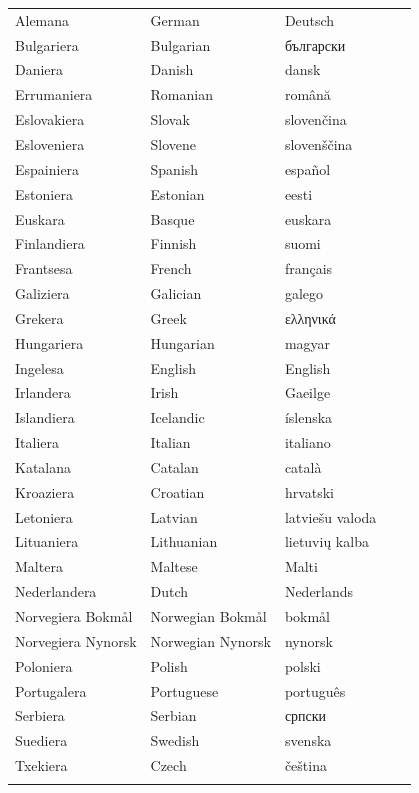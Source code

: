 \vspace*{-5mm}
\centering
  \setlength{\tabcolsep}{2em}
  \begin{tabularx}{\textwidth}{lllll} \toprule\addlinespace
  Alemana & German & Deutsch\\
  Bulgariera & Bulgarian & български \\
  Daniera & Danish & dansk\\
  Errumaniera & Romanian & română\\  
  Eslovakiera & Slovak & slovenčina\\
  Esloveniera & Slovene & slovenščina\\
  Espainiera & Spanish & español\\
  Estoniera & Estonian & eesti\\
  Euskara & Basque & euskara\\
  Finlandiera & Finnish & suomi\\
  Frantsesa & French & français\\
  Galiziera & Galician & galego\\
  Grekera & Greek & ελληνικά\\
  Hungariera & Hungarian & magyar\\ 
  Ingelesa & English & English\\
  Irlandera & Irish & Gaeilge\\
  Islandiera & Icelandic & íslenska\\
  Italiera & Italian & italiano\\
  Katalana & Catalan & català\\
  Kroaziera & Croatian & hrvatski\\
  Letoniera & Latvian & latviešu valoda\\
  Lituaniera & Lithuanian & lietuvių kalba\\
  Maltera & Maltese & Malti\\
  Nederlandera & Dutch & Nederlands\\ 
  Norvegiera Bokmål & Norwegian Bokmål & bokmål\\
  Norvegiera Nynorsk & Norwegian Nynorsk & nynorsk\\
  Poloniera & Polish & polski\\
  Portugalera & Portuguese & português\\
  Serbiera & Serbian & српски\\
  Suediera & Swedish & svenska\\
  Txekiera & Czech & čeština\\  \addlinespace \bottomrule
\end{tabularx}
